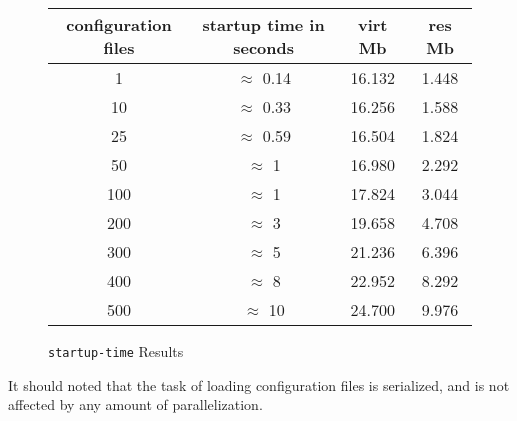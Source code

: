 \begin{figure}[tb]
  \hrulefill\vspace{10pt}
  \begin{center}
    \begin{tabular}{|c|c|c|c|}
      \hline configuration files  & startup time in seconds & virt Mb & res Mb \\
      \hline   1 & $\approx$ 0.14  & 16.132 & 1.448 \\
      \hline  10 & $\approx$ 0.33  & 16.256 & 1.588 \\
      \hline  25 & $\approx$ 0.59  & 16.504 & 1.824 \\
      \hline  50 & $\approx$ 1  & 16.980 & 2.292 \\
      \hline 100 & $\approx$ 1  & 17.824 & 3.044 \\
      \hline 200 & $\approx$ 3  & 19.658 & 4.708 \\
      \hline 300 & $\approx$ 5  & 21.236 & 6.396 \\
      \hline 400 & $\approx$ 8  & 22.952 & 8.292 \\
      \hline 500 & $\approx$ 10 & 24.700 & 9.976 \\
      \hline
    \end{tabular}
  \end{center}
\caption{\texttt{startup-time} Results}\label{samples:startup-time-results}
  \hrulefill
\end{figure}

It should noted that the task of loading configuration files is
serialized, and is not affected by any amount of parallelization.

